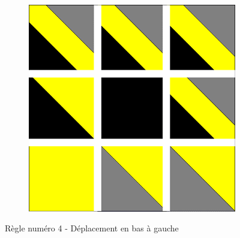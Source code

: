 \documentclass[a4paper]{article}
\begin{document}
\begin{figure}[!h]
\begin{subfigure}[t]{0.17\textwidth}
    \end{subfigure}
    \hfill
    \begin{subfigure}[t]{0.17\textwidth}
        \includegraphics[width=\textwidth]{img/rule41.png}
    \end{subfigure}
    \caption{Règle numéro 4 - Déplacement en bas à gauche}
\end{figure}
\end{document}
